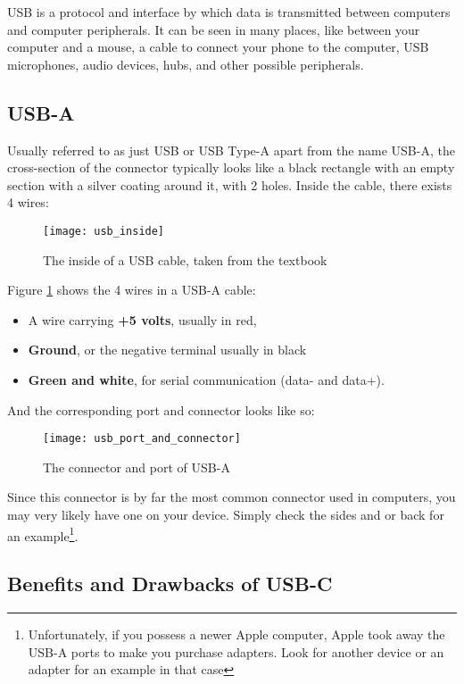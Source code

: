 \documentclass[../main.tex]{subfiles}
\begin{document}
USB is a protocol and interface by which data is transmitted between computers and computer peripherals. It can be seen in many places, like between your computer and a mouse, a cable to connect your phone to the computer, USB microphones, audio devices, hubs, and other possible peripherals.

\subsection{USB-A}

Usually referred to as just USB or USB Type-A apart from the name USB-A, the cross-section of the connector typically looks like a black rectangle with an empty section with a silver coating around it, with 2 holes. Inside the cable, there exists 4 wires:

\begin{figure}[h]
    \centering
    \texttt{[image: usb\_inside]}
    \caption{The inside of a USB cable, taken from the textbook}
    \label{fig:usb_inside}
\end{figure}

Figure \ref{fig:usb_inside} shows the 4 wires in a USB-A cable:

\begin{itemize}
    \item A wire carrying \textbf{+5 volts}, usually in red,
    \item \textbf{Ground}, or the negative terminal usually in black
    \item \textbf{Green and white}, for serial communication (data- and data+).
\end{itemize}

And the corresponding port and connector looks like so:

\begin{figure}[h]
    \centering
    \texttt{[image: usb\_port\_and\_connector]}
    \caption{The connector and port of USB-A}
    \label{fig:usba_port_and_connector}
\end{figure}

Since this connector is by far the most common connector used in computers, you may very likely have one on your device. Simply check the sides and or back
for an example\footnote{Unfortunately, if you possess a newer Apple computer, Apple took away the USB-A ports to make you purchase adapters. Look for another device or an adapter for an example in that case}.

\subsection{Benefits and Drawbacks of USB-C}
\end{document}
